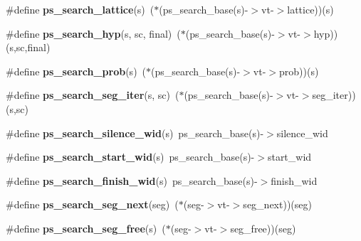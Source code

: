\begin{DoxyCompactItemize}
\item 
\#define {\bfseries ps\-\_\-search\-\_\-lattice}(s)~($\ast$(ps\-\_\-search\-\_\-base(s)-\/$>$vt-\/$>$lattice))(s)\label{pocketsphinx__internal_8h_ac821fb65e0c2ef778a4b8b49ecf30e11}

\item 
\#define {\bfseries ps\-\_\-search\-\_\-hyp}(s, sc, final)~($\ast$(ps\-\_\-search\-\_\-base(s)-\/$>$vt-\/$>$hyp))(s,sc,final)\label{pocketsphinx__internal_8h_a61247136ccf60cf65c19ecc9efebcb73}

\item 
\#define {\bfseries ps\-\_\-search\-\_\-prob}(s)~($\ast$(ps\-\_\-search\-\_\-base(s)-\/$>$vt-\/$>$prob))(s)\label{pocketsphinx__internal_8h_a3fb9e1a2036effd2f15cd088140c750f}

\item 
\#define {\bfseries ps\-\_\-search\-\_\-seg\-\_\-iter}(s, sc)~($\ast$(ps\-\_\-search\-\_\-base(s)-\/$>$vt-\/$>$seg\-\_\-iter))(s,sc)\label{pocketsphinx__internal_8h_a6478039ec1ab5948ff19123c4464a5a4}

\item 
\#define {\bfseries ps\-\_\-search\-\_\-silence\-\_\-wid}(s)~ps\-\_\-search\-\_\-base(s)-\/$>$silence\-\_\-wid\label{pocketsphinx__internal_8h_aab989bd93fe7abcc165bc92d6ccc1bac}

\item 
\#define {\bfseries ps\-\_\-search\-\_\-start\-\_\-wid}(s)~ps\-\_\-search\-\_\-base(s)-\/$>$start\-\_\-wid\label{pocketsphinx__internal_8h_a6dc7da2c1bc3bfb15d5fbe3618a4e3d4}

\item 
\#define {\bfseries ps\-\_\-search\-\_\-finish\-\_\-wid}(s)~ps\-\_\-search\-\_\-base(s)-\/$>$finish\-\_\-wid\label{pocketsphinx__internal_8h_aaeee657147579bc652c494989622f6b4}

\item 
\#define {\bfseries ps\-\_\-search\-\_\-seg\-\_\-next}(seg)~($\ast$(seg-\/$>$vt-\/$>$seg\-\_\-next))(seg)\label{pocketsphinx__internal_8h_ae7c150fad9fc9e8a13e632a1386b8f56}

\item 
\#define {\bfseries ps\-\_\-search\-\_\-seg\-\_\-free}(s)~($\ast$(seg-\/$>$vt-\/$>$seg\-\_\-free))(seg)\label{pocketsphinx__internal_8h_a38f6b225e3eace3793cdae8135b0aaab}

\end{DoxyCompactItemize}
